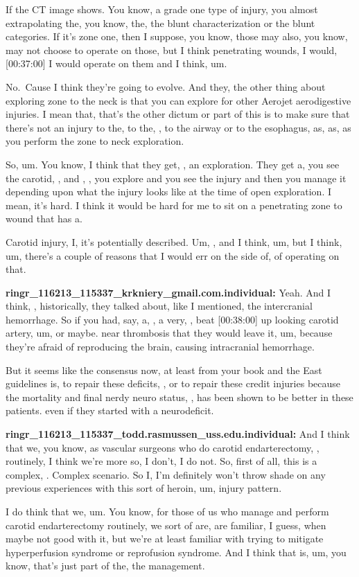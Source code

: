 \documentclass[
]{book}
\begin{document}
If the CT image shows. You know, a grade one type of injury, you almost
extrapolating the, you know, the, the blunt characterization or the
blunt categories. If it's zone one, then I suppose, you know, those may
also, you know, may not choose to operate on those, but I think
penetrating wounds, I would, {[}00:37:00{]} I would operate on them and I
think, um.

No.~Cause I think they're going to evolve. And they, the other thing
about exploring zone to the neck is that you can explore for other
Aerojet aerodigestive injuries. I mean that, that's the other dictum or
part of this is to make sure that there's not an injury to the, to the,
, to the airway or to the esophagus, as, as, as you perform the zone to
neck exploration.

So, um. You know, I think that they get, , an exploration. They get a,
you see the carotid, , and , , you explore and you see the injury and
then you manage it depending upon what the injury looks like at the time
of open exploration. I mean, it's hard. I think it would be hard for me
to sit on a penetrating zone to wound that has a.

Carotid injury, I, it's potentially described. Um, , and I think, um,
but I think, um, there's a couple of reasons that I would err on the
side of, of operating on that.

\textbf{ringr\_116213\_115337\_krkniery\_gmail.com.individual:} Yeah. And I
think, , historically, they talked about, like I mentioned, the
intercranial hemorrhage. So if you had, say, a, , a very, , beat
{[}00:38:00{]} up looking carotid artery, um, or maybe. near thrombosis that
they would leave it, um, because they're afraid of reproducing the
brain, causing intracranial hemorrhage.

But it seems like the consensus now, at least from your book and the
East guidelines is, to repair these deficits, , or to repair these
credit injuries because the mortality and final nerdy neuro status, ,
has been shown to be better in these patients. even if they started with
a neurodeficit.

\textbf{ringr\_116213\_115337\_todd.rasmussen\_uss.edu.individual:} And I think
that we, you know, as vascular surgeons who do carotid endarterectomy, ,
routinely, I think we're more so, I don't, I do not. So, first of all,
this is a complex, . Complex scenario. So I, I'm definitely won't throw
shade on any previous experiences with this sort of heroin, um, injury
pattern.

I do think that we, um. You know, for those of us who manage and perform
carotid endarterectomy routinely, we sort of are, are familiar, I guess,
when maybe not good with it, but we're at least familiar with trying to
mitigate hyperperfusion syndrome or reprofusion syndrome. And I think
that is, um, you know, that's just part of the, the management.
\end{document}
